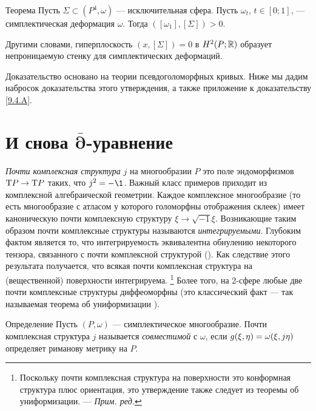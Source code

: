 \begin{thm}{Теорема}\label{10.1.A}
Пусть $\Sigma \subset (P^4, \omega)$ — исключительная сфера.
Пусть $\omega_t$, $t \in [0;1]$, — симплектическая деформация $\omega$.
Тогда $([\omega_1 ], [\Sigma]) > 0$.
\end{thm}

Другими словами, гиперплоскость $(x, [\Sigma]) = 0$ в $H^2 (P;\mathbb{R})$ образует непроницаемую стенку для симплектических деформаций.

Доказательство основано на теории псевдоголоморфных кривых.
Ниже мы дадим набросок доказательства этого утверждения, а также
приложение к доказательству \ref{9.4.A}. 

\section[\texorpdfstring{И снова $\bar\partial$-уравнение}{И снова ∂-уравнение}]{И снова $\bm{\bar\partial}$-уравнение}

\emph{Почти комплексная структура} $j$ на многообразии $P$ это поле
эндоморфизмов $\mathrm{T} P \to \mathrm{T} P$ таких, что $j^2 = -\1$. 
Важный класс примеров приходит из комплексной алгебраической геометрии.
Каждое комплексное многообразие (то есть многообразие с атласом у
которого голоморфны отображения склеек) имеет каноническую почти
комплексную структуру $\xi \to \sqrt{-1}\xi$. 
Возникающие таким образом почти комплексные структуры называются
\emph{интегрируемыми}. 
Глубоким фактом является то, что интегрируемость эквивалентна
обнулению некоторого тензора, связанного с почти комплексной
структурой (\cite{NN}). 
Как следствие этого результата получается, что всякая почти
комплексная структура на (вещественной) поверхности интегрируема.%
\footnote{Поскольку почти комплексная структура на поверхности это конформная структура плюс ориентация,
это утверждение также следует из теоремы об униформизации. — \textit{Прим. ред.}}
Более того, на 2-сфере любые две почти комплексные структуры диффеоморфны (это классический факт — так называемая теорема об униформизации \cite{AS}).

\begin{ex*}{Определение}
Пусть $(P, \omega)$ — симплектическое многообразие.
Почти комплексная структура $j$ называется \emph{совместимой} с $\omega$, если $g(\xi,
\eta) \z= \omega(\xi, j\eta)$ определяет риманову метрику на $P$. 
\end{ex*}


